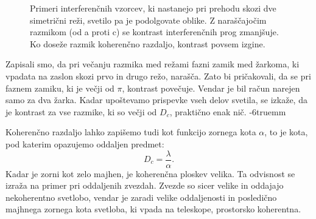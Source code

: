 \begin{figure}[ht]
\centering
\def\svgwidth{140truemm} 

\caption{Primeri interferenčnih vzorcev, ki nastanejo pri prehodu skozi dve simetrični reži, svetilo
pa je podolgovate oblike. Z naraščajočim razmikom (od a proti c) se kontrast interferenčnih prog zmanjšuje.
Ko doseže razmik koherenčno razdaljo, kontrast povsem izgine.}
\label{fig:08_VCZ_slika}
\end{figure}
\begin{remark}
Zapisali smo, da pri večanju razmika med režami fazni zamik med žarkoma, ki vpadata na zaslon skozi
prvo in drugo režo, narašča. Zato bi pričakovali, da se pri faznem zamiku, ki je večji od $\pi$,
kontrast povečuje. Vendar je bil račun narejen samo za dva žarka. Kadar upoštevamo prispevke
vseh delov svetila, se izkaže, da je kontrast za vse razmike, ki so večji od $D_c$, praktično enak nič.
\vglue-6truemm
\end{remark}

Koherenčno razdaljo lahko zapišemo tudi kot funkcijo zornega kota $\alpha$, to je kota, pod 
katerim opazujemo oddaljen predmet:
\begin{equation}
D_c = \frac{\lambda}{\alpha}.
\label{eq:08_32}
\end{equation}
Kadar je zorni kot zelo majhen, je koherenčna ploskev velika. Ta odvisnost se izraža na primer
pri oddaljenih zvezdah. Zvezde so sicer velike in oddajajo nekoherentno svetlobo, vendar je 
zaradi velike oddaljenosti in posledično majhnega zornega kota svetloba, ki vpada 
na teleskope, prostorsko koherentna.

